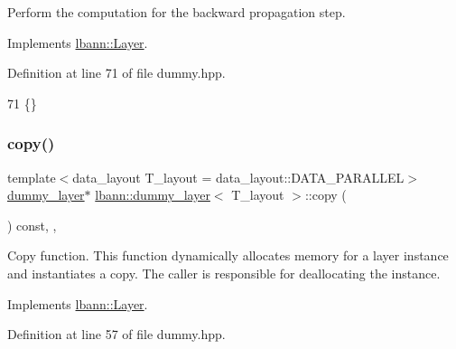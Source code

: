 Perform the computation for the backward propagation step. 

Implements \hyperlink{classlbann_1_1Layer_a7442e01f9ee1294df2de811efcf5171e}{lbann\+::\+Layer}.



Definition at line 71 of file dummy.\+hpp.


\begin{DoxyCode}
71 \{\}
\end{DoxyCode}
\mbox{\label{classlbann_1_1dummy__layer_a673315d873a571bd4b3cacfeffff329c}} 
\subsubsection{\texorpdfstring{copy()}{copy()}}
{\footnotesize\ttfamily template$<$data\+\_\+layout T\+\_\+layout = data\+\_\+layout\+::\+D\+A\+T\+A\+\_\+\+P\+A\+R\+A\+L\+L\+EL$>$ \\
\hyperlink{classlbann_1_1dummy__layer}{dummy\+\_\+layer}$\ast$ \hyperlink{classlbann_1_1dummy__layer}{lbann\+::dummy\+\_\+layer}$<$ T\+\_\+layout $>$\+::copy (\begin{DoxyParamCaption}{ }\end{DoxyParamCaption}) const\hspace{0.3cm}{\ttfamily [inline]}, {\ttfamily [override]}, {\ttfamily [virtual]}}

Copy function. This function dynamically allocates memory for a layer instance and instantiates a copy. The caller is responsible for deallocating the instance. 

Implements \hyperlink{classlbann_1_1Layer_af420f22bbac801c85483ade84588a23f}{lbann\+::\+Layer}.



Definition at line 57 of file dummy.\+hpp.


